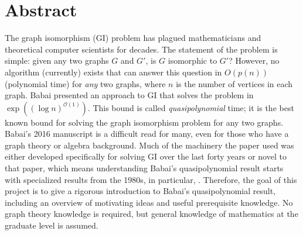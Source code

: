 \documentclass[12pt]{article}
\theoremstyle{ex215}
\begin{document}
\section*{Abstract}
The graph isomorphism (GI) problem has plagued mathematicians and theoretical computer scientists for decades. The statement of the problem is simple: given any two graphs $G$ and $G'$, is $G$ isomorphic to $G'$? However, no algorithm (currently) exists that can answer this question in $O(p(n))$ (polynomial time) for \textit{any} two graphs, where $n$ is the number of vertices in each graph. Babai presented an approach to GI that solves the problem in $\exp\left((\log n)^{\mathcal{O}(1)}\right)$\cite{babai2016,babai2018}. This bound is called \textit{quasipolynomial} time; it is the best known bound for solving the graph isomorphism problem for any two graphs. \\
Babai's 2016 manuscript is a difficult read for many, even for those who have a graph theory or algebra background. Much of the machinery the \cite{babai2016} paper used was either developed specifically for solving GI over the last forty years or novel to that paper, which means understanding Babai's quasipolynomial result starts with specialized results from the 1980s, in particular, \cite{luks1982}. Therefore, the goal of this project is to give a rigorous introduction to Babai's quasipolynomial result, including an overview of motivating ideas and useful prerequisite knowledge. No graph theory knowledge is required, but general knowledge of mathematics at the graduate level is assumed.

    
\end{document}
